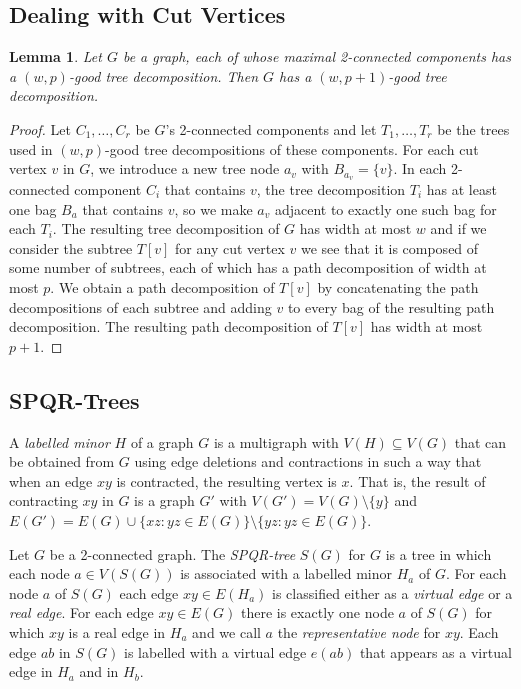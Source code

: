 \documentclass[a4paper,11pt]{article}
\theoremstyle{plain}
\newtheorem{lemma}[theorem]{Lemma}
\theoremstyle{definition}
\begin{document}
\subsection{Dealing with Cut Vertices}

\begin{lemma}
  Let $G$ be a graph, each of whose maximal 2-connected components has
  a $(w,p)$-good tree decomposition. Then $G$ has a $(w,p+1)$-good tree
  decomposition.
\end{lemma}

\begin{proof}
  Let $C_1,\ldots,C_r$ be $G$'s 2-connected components and let
  $T_1,\ldots,T_r$ be the trees used in $(w,p)$-good tree decompositions
  of these components.  For each cut vertex $v$ in $G$, we introduce a new
  tree node $a_v$ with $B_{a_v}=\{v\}$.  In each 2-connected component
  $C_i$ that contains $v$, the tree decomposition $T_i$ has at least
  one bag $B_a$ that contains $v$, so we make $a_v$ adjacent to exactly
  one such bag for each $T_i$.  The resulting tree decomposition of $G$
  has width at most $w$ and if we consider the subtree $T[v]$ for any cut
  vertex $v$ we see that it is composed of some number of subtrees, each
  of which has a path decomposition of width at most $p$.  We obtain a
  path decomposition of $T[v]$ by concatenating the path decompositions
  of each subtree and adding $v$ to every bag of the resulting path
  decomposition. The resulting path decomposition of $T[v]$ has width
  at most $p+1$.
\end{proof}


\subsection{SPQR-Trees}

A \emph{labelled minor} $H$ of a graph $G$ is a multigraph with
$V(H)\subseteq V(G)$ that can be obtained from $G$ using edge deletions
and contractions in such a way that when an edge $xy$ is contracted,
the resulting vertex is $x$.  That is, the result of contracting $xy$
in $G$ is a graph $G'$ with $V(G')=V(G)\setminus \{y\}$ and $E(G') =
E(G)\cup \{xz : yz\in E(G)\} \setminus \{yz: yz\in E(G)\}$.

Let $G$ be a 2-connected graph. The \emph{SPQR-tree} $S(G)$ for $G$
is a tree in which each node $a\in V(S(G))$ is associated with a
labelled minor $H_a$ of $G$.  For each node $a$ of $S(G)$ each
edge $xy\in E(H_a)$ is classified either as a \emph{virtual edge} or
a \emph{real edge}.  For each edge $xy\in E(G)$ there is exactly one
node $a$ of $S(G)$ for which $xy$ is a real edge in $H_a$ and we call
$a$ the \emph{representative node} for $xy$.  Each edge $ab$ in $S(G)$
is labelled with a virtual edge $e(ab)$ that appears as a virtual edge
in $H_a$ and in $H_b$.
\end{document}
